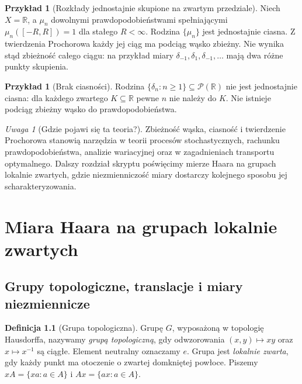 \documentclass[11pt,a4paper,oneside]{book}
\numberwithin{equation}{chapter}
\theoremstyle{plain}
\theoremstyle{definition}
\newtheorem{definicja}[twierdzenie]{Definicja}
\newtheorem{przyklad}[twierdzenie]{Przykład}
\theoremstyle{remark}
\newtheorem{uwaga}[twierdzenie]{Uwaga}
\begin{document}
\begin{przyklad}[Rozkłady jednostajnie skupione na zwartym przedziale]
Niech $X=\mathbb R$, a $\mu_n$ dowolnymi
prawdopodobieństwami spełniającymi
$\mu_n([-R,R])=1$ dla stałego $R<\infty$.
Rodzina $\{\mu_n\}$ jest jednostajnie ciasna.
Z twierdzenia Prochorowa każdy jej ciąg ma podciąg
wąsko zbieżny. Nie wynika stąd zbieżność całego ciągu:
na przykład miary $\delta_{-1},\delta_1,\delta_{-1},\ldots$
mają dwa różne punkty skupienia.
\end{przyklad}

\begin{przyklad}[Brak ciasności]
Rodzina $\{\delta_n:n\ge1\}\subseteq\mathcal P(\mathbb R)$
nie jest jednostajnie ciasna: dla każdego zwartego
$K\subseteq\mathbb R$ pewne $n$ nie należy do $K$.
Nie istnieje podciąg zbieżny wąsko do prawdopodobieństwa.
\end{przyklad}

\begin{uwaga}[Gdzie pojawi się ta teoria?]
Zbieżność wąska, ciasność i twierdzenie Prochorowa
stanowią narzędzia w teorii procesów stochastycznych,
rachunku prawdopodobieństwa, analizie wariacyjnej
oraz w zagadnieniach transportu optymalnego.
Dalszy rozdział skryptu poświęcimy mierze Haara
na grupach lokalnie zwartych, gdzie niezmienniczość
miary dostarczy kolejnego sposobu jej scharakteryzowania.
\end{uwaga}



\chapter{Miara Haara na grupach lokalnie zwartych}
\label{ch:haar-23}

\section{Grupy topologiczne, translacje i miary niezmiennicze}
\begin{definicja}[Grupa topologiczna]
\label{def:topological-group-23}
Grupę $G$, wyposażoną w topologię Hausdorffa, nazywamy
\emph{grupą topologiczną}, gdy odwzorowania $(x,y)\mapsto xy$
oraz $x\mapsto x^{-1}$ są ciągłe. Element neutralny oznaczamy $e$.
Grupa jest \emph{lokalnie zwarta}, gdy każdy punkt ma otoczenie
o zwartej domkniętej powłoce. Piszemy $xA=\{xa:a\in A\}$
i $Ax=\{ax:a\in A\}$.
\end{definicja}
\end{document}
